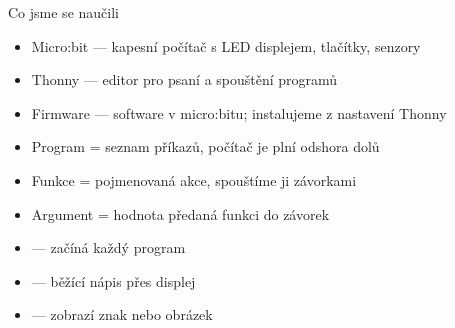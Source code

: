 \begin{frame}{Co jsme se naučili}
  \begin{itemize}
    \item[\checkmark] Micro:bit — kapesní počítač s LED displejem, tlačítky, senzory
    \item[\checkmark] Thonny — editor pro psaní a spouštění programů
    \item[\checkmark] Firmware — software v micro:bitu; instalujeme z nastavení Thonny
    \item[\checkmark] Program = seznam příkazů, počítač je plní odshora dolů
    \item[\checkmark] Funkce = pojmenovaná akce, spouštíme ji závorkami
    \item[\checkmark] Argument = hodnota předaná funkci do závorek
    \item[\checkmark]  — začíná každý program
    \item[\checkmark]  — běžící nápis přes displej
    \item[\checkmark]  — zobrazí znak nebo obrázek
  \end{itemize}
\end{frame}


